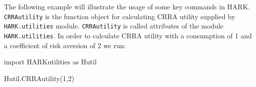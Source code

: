 \message{ !name(ccarroll_et_al_scipy_2018.tex)}\documentclass[10pt,twocolumn]{article}
\newenvironment{Shaded}{\begin{snugshade}}{\end{snugshade}}
\newcommand{\DecValTok}[1]{\textcolor[rgb]{0.00,0.00,0.81}{#1}}
\newcommand{\ImportTok}[1]{#1}
\newcommand{\NormalTok}[1]{#1}
\begin{document}

The following example will illustrate the usage of some key commands in HARK.  \texttt{CRRAutility} is the function object for calculating CRRA utility supplied by \texttt{HARK.utilities} module. \texttt{CRRAutility} is called attributes of the module \texttt{HARK.utilities}. In order to calculate CRRA utility with a consumption of 1 and a coefficient of risk aversion of 2 we run:

\begin{Shaded}
\begin{Highlighting}[]
\ImportTok{import}\NormalTok{ HARKutilities }\ImportTok{as}\NormalTok{ Hutil}

\NormalTok{Hutil.CRRAutility(}\DecValTok{1}\NormalTok{,}\DecValTok{2}\NormalTok{)  }
\end{Highlighting}
\end{Shaded}
\end{document}
